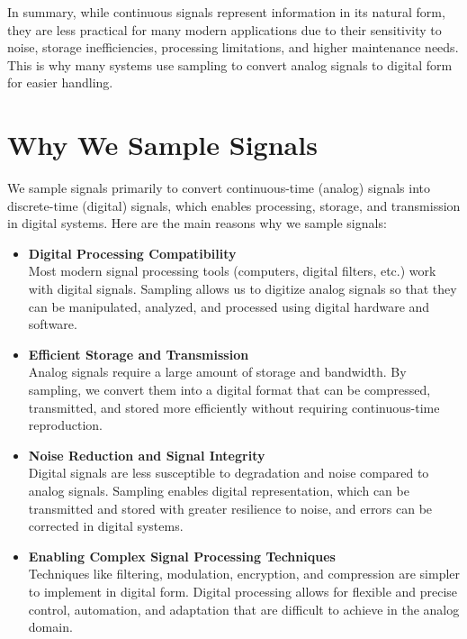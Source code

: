 \documentclass[12pt,a4paper]{report}
\begin{document}
In summary, while continuous signals represent information in its natural form, they are less practical for many modern applications due to their sensitivity to noise, storage inefficiencies, processing limitations, and higher maintenance needs. This is why many systems use sampling to convert analog signals to digital form for easier handling.

\section*{Why We Sample Signals}

We sample signals primarily to convert continuous-time (analog) signals into discrete-time (digital) signals, which enables processing, storage, and transmission in digital systems. Here are the main reasons why we sample signals:

\begin{itemize}
    \item \textbf{Digital Processing Compatibility}\\
    Most modern signal processing tools (computers, digital filters, etc.) work with digital signals. Sampling allows us to digitize analog signals so that they can be manipulated, analyzed, and processed using digital hardware and software.
    
    \item \textbf{Efficient Storage and Transmission}\\
    Analog signals require a large amount of storage and bandwidth. By sampling, we convert them into a digital format that can be compressed, transmitted, and stored more efficiently without requiring continuous-time reproduction.
    
    \item \textbf{Noise Reduction and Signal Integrity}\\
    Digital signals are less susceptible to degradation and noise compared to analog signals. Sampling enables digital representation, which can be transmitted and stored with greater resilience to noise, and errors can be corrected in digital systems.
    
    \item \textbf{Enabling Complex Signal Processing Techniques}\\
    Techniques like filtering, modulation, encryption, and compression are simpler to implement in digital form. Digital processing allows for flexible and precise control, automation, and adaptation that are difficult to achieve in the analog domain.
\end{itemize}
\end{document}

